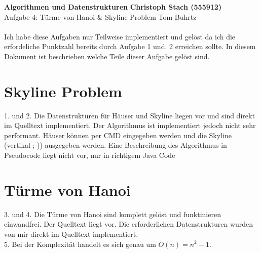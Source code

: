 \documentclass[a4paper, 11pt]{article}
\begin{document}
\noindent
\large\textbf{Algorithmen und Datenstrukturen} \hfill \textbf{Christoph Stach (555912)} \\
\normalsize Aufgabe 4: Türme von Hanoi \& Skyline Problem \hfill Tom Buhrtz \\
\\
Ich habe diese Aufgaben nur Teilweise implementiert und gelöst da ich die erfordeliche Punktzahl bereits durch Aufgabe 1 und. 2
erreichen sollte. In diesem Dokument ist beschrieben welche Teile dieser Aufgabe gelöst sind.

\section*{Skyline Problem}
1. und 2. Die Datenstrukturen für Häuser und Skyline liegen vor und sind direkt im Quelltext implementiert.
Der Algorithmus ist implementiert jedoch nicht sehr performant.
Häuser können per CMD eingegeben werden und die Skyline (vertikal ;-)) ausgegeben werden.
Eine Beschreibung des Algorithmus in Pseudocode liegt nicht vor, nur in richtigem Java Code


\section*{Türme von Hanoi}
3. und 4. Die Türme von Hanoi sind komplett gelöst und funktinieren einwandfrei. Der Quelltext liegt vor.
Die erforderlichen Datenstrukturen wurden von mir direkt im Quelltext implementiert. \\
5. Bei der Komplexität handelt es sich genau um $O(n) = n^2 - 1$.
\end{document}
